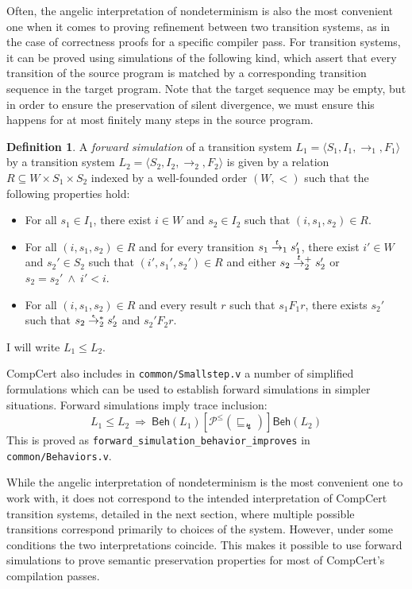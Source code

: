 \documentclass[11pt,oneside]{book}
\theoremstyle{definition}
\newtheorem{definition}[theorem]{Definition}
\newcommand{\kw}[1]{\ensuremath{ \mathsf{#1} }}
\newcommand{\ifr}[1]{\mathrel{[{#1}]}}
\newcommand{\refby}{\sqsubseteq} %
\begin{document}
Often,
the angelic interpretation of nondeterminism
is also the most convenient one
when it comes to proving refinement between
two transition systems,
as in the case of correctness proofs for
a specific compiler pass.
For transition systems,
it can be proved using simulations of the following kind,
which assert that every transition of the source program
is matched by a corresponding transition sequence in the target program.
Note that the target sequence may be empty,
but in order to ensure the preservation of silent divergence,
we must ensure this happens for at most
finitely many steps in the source program.

\begin{definition}
A \emph{forward simulation}
of a transition system
$L_1 = \langle S_1, I_1, {\rightarrow}_1, F_1 \rangle$
by a transition system
$L_2 = \langle S_2, I_2, {\rightarrow}_2, F_2 \rangle$
is given by a relation $R \subseteq W \times S_1 \times S_2$
indexed by a well-founded order $(W, {<})$
such that the following properties hold:
\begin{itemize}
  \item For all $s_1 \in I_1$,
    there exist $i \in W$ and $s_2 \in I_2$
    such that $(i, s_1, s_2) \in R$.
  \item For all $(i, s_1, s_2) \in R$
    and for every transition
    $s_1 \mathrel{\smash{\stackrel{t}{\rightarrow}}_1} s_1'$,
    there exist $i' \in W$ and $s_2' \in S_2$
    such that $(i', s_1', s_2') \in R$ and either
    $s_2 \mathrel{\smash{\stackrel{t}{\rightarrow}}_2^+} s_2'$ or
    $s_2 = s_2' \:\wedge\: i' < i$.
  \item For all $(i, s_1, s_2) \in R$
    and every result $r$ such that $s_1 \mathrel{F_1} r$,
    there exists $s_2'$ such that
    $s_2 \mathrel{\smash{\stackrel{\epsilon}{\rightarrow}}_2^*} s_2'$ and
    $s_2' \mathrel{F_2} r$.
\end{itemize}
I will write $L_1 \le L_2$.
\end{definition}

CompCert also includes in \texttt{common/Smallstep.v}
a number of simplified formulations
which can be used to establish forward simulations
in simpler situations.
Forward simulations imply trace inclusion:
\[
  L_1 \le L_2
  \: \Rightarrow \:
  \kw{Beh}(L_1) \ifr{\mathcal{P}^\le(\refby_\lightning)} \kw{Beh}(L_2)
\]
This is proved as \texttt{forward\_simulation\_behavior\_improves}
in \texttt{common/Behaviors.v}.

While the angelic interpretation
of nondeterminism is the most convenient one to work with,
it does not correspond to the intended interpretation
of CompCert transition systems,
detailed in the next section,
where multiple possible transitions correspond
primarily to choices of the system.
However,
under some conditions
the two interpretations coincide.
This makes it possible to use forward simulations
to prove semantic preservation properties
for most of CompCert's compilation passes.
\end{document}
